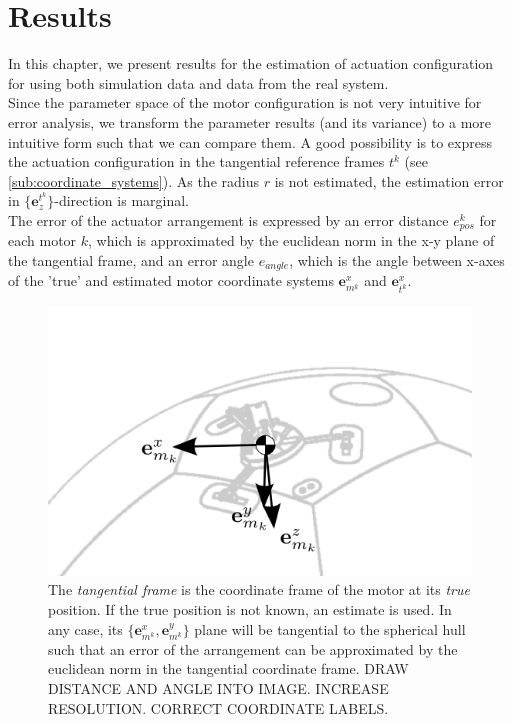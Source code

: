 \chapter{Results}
\label{chap:simulation_results}
In this chapter, we present results for the estimation of actuation configuration for using both simulation data and data from the real system. \\

Since the parameter space of the motor configuration is not very intuitive for error analysis,
we transform the parameter results (and its variance) to a more intuitive form such that we can compare them.
A good possibility is to express the actuation configuration in the tangential reference frames $t^k$ (see \cref{sub:coordinate_systems}).
As the radius $r$ is not estimated, the estimation error in
$\lbrace \mathbf{e}^{t^k}_z \rbrace$-direction is marginal.
\\
The error of the actuator arrangement is expressed by an error distance $e_{pos}^k$ for each motor $k$, which is approximated by the euclidean norm in the x-y plane of the tangential frame,
and an error angle $e_{angle}$, which is the angle between x-axes of the 'true' and estimated motor coordinate systems $\mathbf{e}_{m^k}^x$ and $\mathbf{e}_{t^k}^x$.

\begin{figure}[hbtp]
\centering
\includegraphics[scale=1]{images/tangential_frame.png}
\caption{The \textit{tangential frame} is the coordinate frame of the motor at its \textit{true} position. If the true position is not known, an estimate is used. In any case, its $\lbrace \mathbf{e}^x_{m^k} , \mathbf{e}^y_{m^k} \rbrace$ plane will be tangential to the spherical hull such that an error of the arrangement can be approximated by the euclidean norm in the tangential coordinate frame.
DRAW DISTANCE AND ANGLE INTO IMAGE. INCREASE RESOLUTION. CORRECT COORDINATE LABELS.}
\label{fig:tangential_frame}
\end{figure}

